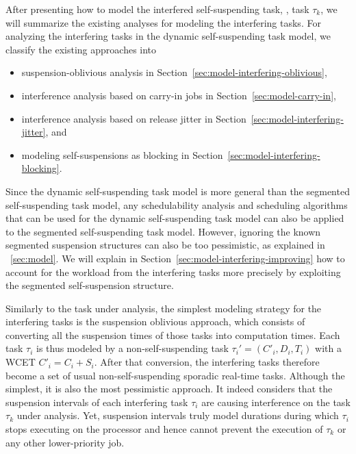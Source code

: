 \label{sec:model-interfering}

After presenting how to model the interfered self-suspending task, \ie, task $\tau_k$, we will summarize the existing analyses for modeling the interfering tasks. For analyzing the interfering tasks in the dynamic self-suspending task model, we classify the existing approaches into 
\begin{itemize}
\item suspension-oblivious analysis in Section~\ref{sec:model-interfering-oblivious}, 
\item interference analysis based on carry-in jobs in Section~\ref{sec:model-carry-in},
\item interference analysis based on release jitter in Section~\ref{sec:model-interfering-jitter}, and 
\item modeling self-suspensions as blocking in Section~\ref{sec:model-interfering-blocking}.
\end{itemize}
Since the dynamic self-suspending task model is more general than the segmented self-suspending task model, any schedulability analysis and scheduling algorithms that can be used for the dynamic self-suspending task model can also be applied to the segmented self-suspending task model. However, ignoring the known segmented suspension structures can also be too pessimistic, as explained in \mysectionref{}~\ref{sec:model}. We will explain in Section~\ref{sec:model-interfering-improving} how to account for the workload from the interfering tasks more precisely by exploiting the segmented self-suspension structure.

\label{sec:model-interfering-oblivious}

Similarly to the task under analysis, the simplest modeling strategy for the interfering tasks is the suspension oblivious approach, which consists of converting all the suspension times of those tasks into computation times. Each task $\tau_i$ is thus modeled by a non-self-suspending task $\tau_i' = (C'_i, D_i, T_i)$ with a WCET $C'_i = C_i+S_i$. After that conversion, the interfering tasks therefore become a set of usual non-self-suspending sporadic real-time tasks. Although the simplest, it is also the most pessimistic approach. It indeed considers that the suspension intervals of each interfering task $\tau_i$ are causing interference on the task $\tau_k$ under analysis. Yet, suspension intervals truly model durations during which $\tau_i$ stops executing on the processor and hence cannot prevent the execution of $\tau_k$ or any other lower-priority job.


